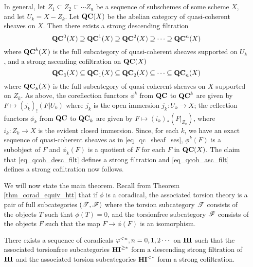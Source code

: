 \begin{ex}
In general, let $Z_1 \subseteq Z_2 \subseteq \cdots Z_n$ be
a sequence of subschemes of some scheme $X$, and let $U_k =
X - Z_k$. Let $\mathbf{QC}(X)$ be the abelian category of quasi-coherent 
sheaves on $X$. Then there exists a strong descending filtration 
\begin{equation}\label{eq_qcoh_desc_filt}
\mathbf{QC}^0(X) \supseteq \mathbf{QC}^1(X) \supseteq \mathbf{QC}^2(X) \supseteq 
   \cdots \supseteq \mathbf{QC}^n(X)
\end{equation}
where $\mathbf{QC}^k(X)$ is the full subcategory of quasi-coherent sheaves
supported on $U_k$, and a strong ascending cofiltration on 
$\mathbf{QC}(X)$
\begin{equation}\label{eq_qcoh_asc_filt}
\mathbf{QC}_0(X) \subseteq \mathbf{QC}_1(X) \subseteq \mathbf{QC}_2(X) \subseteq \cdots
\subseteq \mathbf{QC}_n(X)
\end{equation}
where $\mathbf{QC}_k(X)$ is the full subcategory of quasi-coherent 
sheaves on $X$ supported on $Z_k$. As above, the coreflection 
functors $\phi^k$ from $\mathbf{QC}$ to $\mathbf{QC}^k$ are given by $F 
\mapsto (j_k)_!(F|U_k)$ where $j_k$ is the open immersion $j_k: 
U_k \to X$; the reflection functors $\phi_k$ from $\mathbf{QC}$ to 
$\mathbf{QC}_k$ are given by $F \mapsto (i_k)_*(F|_{Z_k})$, where $i_k: 
Z_k \to X$ is the evident closed immersion. Since, for each 
$k$, we have an exact sequence of quasi-coherent sheaves as in
\eqref{eq_qc_sheaf_ses}, $\phi^k(F)$ is a subobject of $F$ and
$\phi_k(F)$ is a quotient of $F$ for each $F$ in $\mathbf{QC}(X)$.
The claim that \eqref{eq_qcoh_desc_filt} defines a strong 
filtration and \eqref{eq_qcoh_asc_filt} defines a strong 
cofiltration now follows.
\end{ex}

We will now state the main theorem. Recall from Theorem 
\ref{thm_corad_equiv_htt} that if $\phi$ is a coradical, the 
associated torsion theory is a pair of full subcategories
$(\mathscr{T}, \mathscr{F})$ where the torsion subcategory $\mathscr{T}$ consists
of the objects $T$ such that $\phi(T) = 0$, and the torsionfree
subcategory $\mathscr{F}$ consists of the objects $F$ such that the map
$F \to \phi(F)$ is an isomorphism.

\begin{thm}\label{thm_main_result}
There exists a sequence of coradicals $\varphi^{< n}, n = 0, 1, 2 
\cdots$ on $\mathbf{HI}$ such that the associated torsionfree 
subcategories $\mathbf{HI}^{\geq *}$ form a descending strong filtration
of $\mathbf{HI}$ and the associated torsion subcategories $\mathbf{HI}^{< *}$ 
form a strong cofiltration.
\end{thm}


